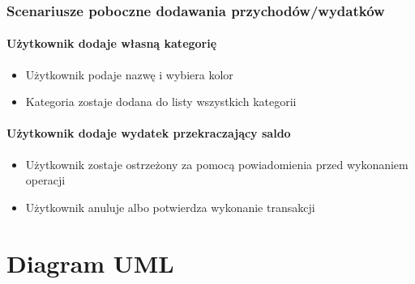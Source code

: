 \documentclass[12pt,a4paper,oneside]{article}
\begin{document}
\subsubsection{Scenariusze poboczne dodawania przychodów/wydatków}
\paragraph{Użytkownik dodaje własną kategorię}
\begin{itemize}
    \item Użytkownik podaje nazwę i wybiera kolor
    \item Kategoria zostaje dodana do listy wszystkich kategorii
\end{itemize}

\paragraph{Użytkownik dodaje wydatek przekraczający saldo}
\begin{itemize}
    \item Użytkownik zostaje ostrzeżony za pomocą powiadomienia przed wykonaniem
          operacji
    \item Użytkownik anuluje albo potwierdza wykonanie transakcji
\end{itemize}

\section{Diagram UML}
\begin{figure}[H]
\end{figure}
\end{document}
